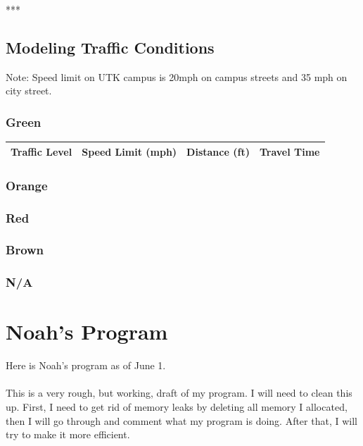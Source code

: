 \documentclass{article}
\begin{document}
***

\subsection{Modeling Traffic Conditions}
Note: Speed limit on UTK campus is 20mph on campus streets and 35 mph on city street. \\

\subsubsection{Green}

\begin{center}
\begin{tabular}{|c|c|c|c|} \hline
Traffic Level & Speed Limit (mph) & Distance (ft) & Travel Time  \\ \hline 



\end{tabular}
\end{center}

\subsubsection{Orange}

\subsubsection{Red}

\subsubsection{Brown}

\subsubsection{N/A}



\newpage
\section{Noah's Program}
Here is Noah's program as of June 1.\\ \\
This is a very rough, but working, draft of my program. I will need to clean this up. First, I need to get rid of memory leaks by deleting all memory I allocated, then I will go through and comment what my program is doing. After that, I will try to make it more efficient. 

\end{document}
